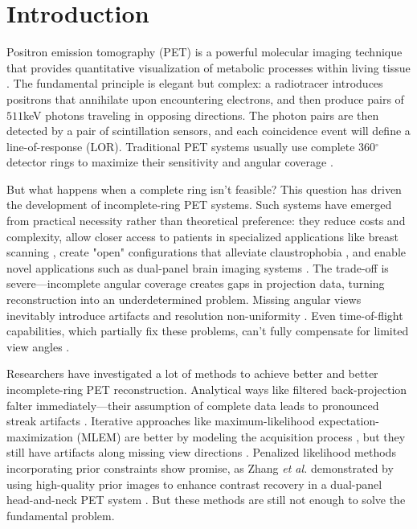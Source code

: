 \documentclass[12pt]{iopart}
\begin{document}
\section{Introduction}
\label{chap:introduction}


Positron emission tomography (PET) is a powerful molecular imaging technique that provides quantitative visualization of metabolic processes within living tissue \cite{townsend2004}. The fundamental principle is elegant but complex: a radiotracer introduces positrons that annihilate upon encountering electrons, and then produce pairs of $511$keV photons traveling in opposing directions. 
The photon pairs are then detected by a pair of scintillation sensors, and each coincidence event will define a line-of-response (LOR).
Traditional PET systems usually use complete 360$^\circ$ detector rings to maximize their sensitivity and angular coverage \cite{townsend2004}.

But what happens when a complete ring isn't feasible? This question has driven the development of incomplete-ring PET systems. Such systems have emerged from practical necessity rather than theoretical preference: they reduce costs and complexity, allow closer access to patients in specialized applications like breast scanning \cite{surti2008}, create "open" configurations that alleviate claustrophobia \cite{tashima2012, krishnamoorthy2021}, and enable novel applications such as dual-panel brain imaging systems \cite{zhang2020}. The trade-off is severe—incomplete angular coverage creates gaps in projection data, turning reconstruction into an underdetermined problem. Missing angular views inevitably introduce artifacts and resolution non-uniformity \cite{kak1988, surti2008}. Even time-of-flight capabilities, which partially fix these problems, can't fully compensate for limited view angles \cite{surti2008, krishnamoorthy2021}.

Researchers have investigated a lot of methods to achieve better and better incomplete-ring PET reconstruction. Analytical ways like filtered back-projection falter immediately—their assumption of complete data leads to pronounced streak artifacts \cite{kak1988}. Iterative approaches like maximum-likelihood expectation-maximization (MLEM) are better by modeling the acquisition process \cite{qi2006}, but they still have artifacts along missing view directions \cite{zhang2020}.
Penalized likelihood methods incorporating prior constraints show promise, as Zhang \textit{et al.} demonstrated by using high-quality prior images to enhance contrast recovery in a dual-panel head-and-neck PET system \cite{zhang2020}. But these methods are still not enough to solve the fundamental problem.
\end{document}
